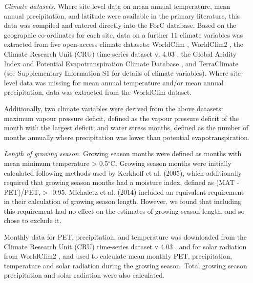 \documentclass[]{article}
\begin{document}
\emph{Climate datasets.} Where site-level data on mean annual
temperature, mean annual precipitation, and latitude were available in
the primary literature, this data was compiled and entered directly into
the ForC database. Based on the geographic co-ordinates for each site,
data on a further 11 climate variables was extracted from five
open-access climate datasets: WorldClim \citep{hijmans_very_2005},
WorldClim2 \citep{fick_worldclim_2017}, the Climate Research Unit (CRU)
time-series dataset v. 4.03 \citep{harris_updated_2014}, the Global
Aridity Index and Potential Evapotranspiration Climate Database
\citep{trabucco_global_2018}, and TerraClimate
\citep{abatzoglou_terraclimate_2018} (see Supplementary Information S1
for details of climate variables). Where site-level data was missing for
mean annual temperature and/or mean annual precipitation, data was
extracted from the WorldClim dataset.

Additionally, two climate variables were derived from the above
datasets: maximum vapour pressure deficit, defined as the vapour
pressure deficit of the month with the largest deficit; and water stress
months, defined as the number of months annually where precipitation was
lower than potential evapotranspiration.

\emph{Length of growing season.} Growing season months were defined as
months with mean minimum temperature \textgreater{} 0.5\(^\circ\)C.
Growing season months were initially calculated following methods used
by Kerkhoff et al. (2005), which additionally required that growing
season months had a moisture index, defined as (MAT - PET)/PET,
\textgreater{} -0.95. Michaletz et al. (2014) included an equivalent
requirement in their calculation of growing season length. However, we
found that including this requirement had no effect on the estimates of
growing season length, and so chose to exclude it.

Monthly data for PET, precipitation, and temperature was downloaded from
the Climate Research Unit (CRU) time-series dataset v 4.03
\citep{harris_updated_2014}, and for solar radiation from WorldClim2
\citep{fick_worldclim_2017}, and used to calculate mean monthly PET,
precipitation, temperature and solar radiation during the growing
season. Total growing season precipitation and solar radiation were also
calculated.
\end{document}
